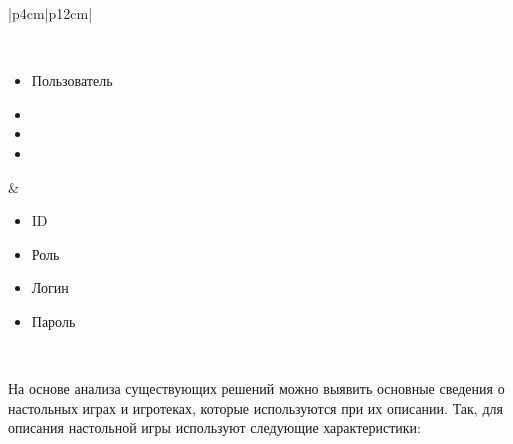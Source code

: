 \begin{table}[h!]
\begin{center}
\begin{threeparttable}
\begin{tabular}{|p{4cm}|p{12cm}|}
\begin{minipage}[t]{\linewidth}
\begin{multicols}{2}
\begin{itemize}[leftmargin=0mm,labelsep=0mm,nosep,after=\strut]
                \end{itemize}
              \end{multicols}
            \end{minipage}\\
            \hline
            \begin{minipage}[t]{\linewidth}
              \begin{multicols}{0}
                \begin{itemize}[leftmargin=0mm,labelsep=0mm,nosep,after=\strut]
                  \item[] Пользователь
                  \item[]
                  \item[]
                  \item[]
                \end{itemize}
              \end{multicols}
            \end{minipage}
          & \begin{minipage}[t]{\linewidth}
              \begin{multicols}{2}
                \begin{itemize}[leftmargin=0mm,labelsep=0mm,nosep,after=\strut]
                  \item[] ID
                  \item[] Роль
                  \item[] Логин
                  \item[] Пароль
                \end{itemize}
              \end{multicols}
            \end{minipage}\\
           \hline
        \end{tabular}
    \end{threeparttable}
    \end{center}
\end{table} 
\vspace{-0.5cm}

На основе анализа существующих решений можно выявить основные сведения о
настольных играх и игротеках, которые используются при их описании. Так, для
описания настольной игры используют следующие характеристики:

